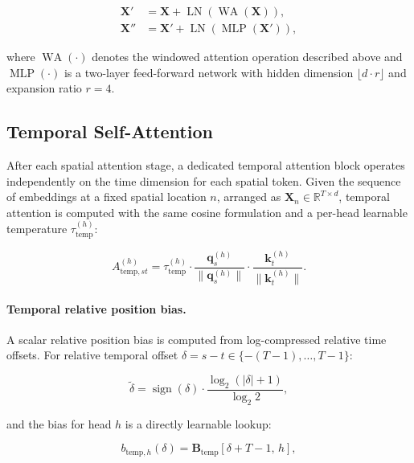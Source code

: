 \begin{align}
    \mathbf{X}' &= \mathbf{X} + \operatorname{LN}\!\left(\operatorname{WA}(\mathbf{X})\right), \\
    \mathbf{X}'' &= \mathbf{X}' + \operatorname{LN}\!\left(\operatorname{MLP}(\mathbf{X}')\right),
\end{align}

where $\operatorname{WA}(\cdot)$ denotes the windowed attention operation described above and $\operatorname{MLP}(\cdot)$ is a two-layer feed-forward network with hidden dimension $\lfloor d \cdot r \rfloor$ and expansion ratio $r = 4$.

\subsection{Temporal Self-Attention}

After each spatial attention stage, a dedicated temporal attention block operates independently on the time dimension for each spatial token. Given the sequence of embeddings at a fixed spatial location $n$, arranged as $\mathbf{X}_n \in \mathbb{R}^{T \times d}$, temporal attention is computed with the same cosine formulation \cite{LuoCosineNormalization2017} and a per-head learnable temperature $\tau_{\text{temp}}^{(h)}$:

\begin{equation}
    A^{(h)}_{\text{temp},st} = \tau^{(h)}_{\text{temp}} \cdot \frac{\mathbf{q}_s^{(h)}}{\|\mathbf{q}_s^{(h)}\|} \cdot \frac{\mathbf{k}_t^{(h)}}{\|\mathbf{k}_t^{(h)}\|}.
\end{equation}

\paragraph{Temporal relative position bias.}
A scalar relative position bias is computed from log-compressed relative time offsets. For relative temporal offset $\delta = s - t \in \{-(T-1), \ldots, T-1\}$:

\begin{equation}
    \tilde{\delta} = \operatorname{sign}(\delta) \cdot \frac{\log_2(|\delta| + 1)}{\log_2 2},
\end{equation}

and the bias for head $h$ is a directly learnable lookup:

\begin{equation}
    b_{\text{temp},h}(\delta) = \mathbf{B}_{\text{temp}}\!\left[\delta + T - 1,\, h\right],
\end{equation}

